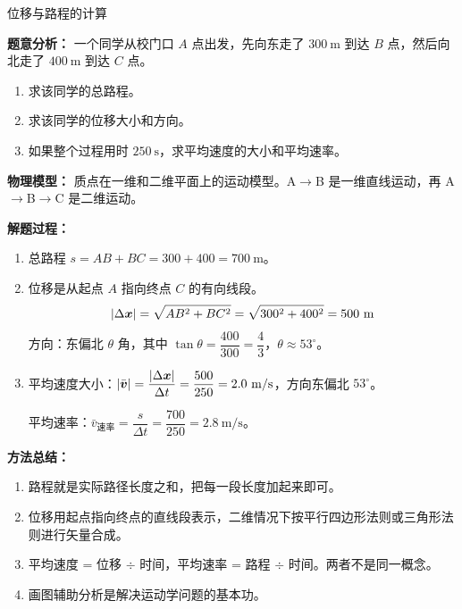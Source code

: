 \begin{examplebox}{位移与路程的计算}

\textbf{题意分析：} 一个同学从校门口 $A$ 点出发，先向东走了 $300\ \mathrm{m}$ 到达 $B$ 点，然后向北走了 $400\ \mathrm{m}$ 到达 $C$ 点。
\begin{enumerate}
  \item 求该同学的总路程。
  \item 求该同学的位移大小和方向。
  \item 如果整个过程用时 $250\ \mathrm{s}$，求平均速度的大小和平均速率。
\end{enumerate}

\textbf{物理模型：} 质点在一维和二维平面上的运动模型。A$\to$B 是一维直线运动，再 A$\to$B$\to$C 是二维运动。

\textbf{解题过程：}

\begin{enumerate}
  \item 总路程 $s = AB + BC = 300 + 400 = 700\ \mathrm{m}$。

  \item 位移是从起点 $A$ 指向终点 $C$ 的有向线段。
  \[
  |\Delta\boldsymbol{x}| = \sqrt{AB^2 + BC^2} = \sqrt{300^2 + 400^2} = 500\ \mathrm{m}
  \]
  方向：东偏北 $\theta$ 角，其中 $\tan\theta = \dfrac{400}{300} = \dfrac{4}{3}$，$\theta \approx 53^\circ$。

  \item 平均速度大小：$|\bar{\vect{v}}| = \dfrac{|\Delta\vect{x}|}{\Delta t} = \dfrac{500}{250} = 2.0\ \mathrm{m/s}$，方向东偏北 $53^\circ$。

  平均速率：$\bar{v}_{\text{速率}} = \dfrac{s}{\Delta t} = \dfrac{700}{250} = 2.8\ \mathrm{m/s}$。
\end{enumerate}

\begin{center}


\label{fig:displacement-composition}
\end{center}

\textbf{方法总结：}
\begin{enumerate}
  \item 路程就是实际路径长度之和，把每一段长度加起来即可。
  \item 位移用起点指向终点的直线段表示，二维情况下按平行四边形法则或三角形法则进行矢量合成。
  \item 平均速度 = 位移 $\div$ 时间，平均速率 = 路程 $\div$ 时间。两者不是同一概念。
  \item 画图辅助分析是解决运动学问题的基本功。
\end{enumerate}

\end{examplebox}

